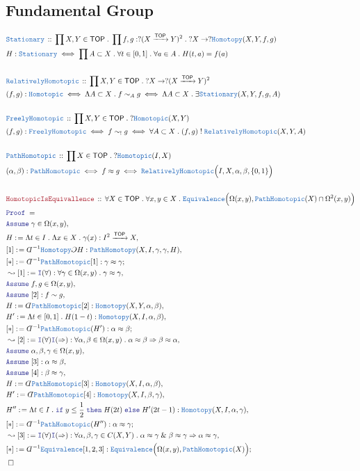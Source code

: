 \documentclass[12pt]{scrartcl}
\newcommand{\TYPE}[1]{\textcolor{NavyBlue}{\mathtt{#1}}}
\newcommand{\LOGIC}[1]{\textcolor{Blue}{\mathtt{#1}}}
\newcommand{\THM}[1]{\textcolor{Maroon}{\mathtt{#1}}}
\renewcommand{\.}{\; . \;}
\newcommand{\de}{: \kern 0.1pc =}
\newcommand{\If}{\LOGIC{if} \;}
\newcommand{\Then}{ \; \LOGIC{then} \;}
\newcommand{\Else}{\; \LOGIC{else} \;}
\newcommand{\IsNot}{\; ! \;}
\newcommand{\Theorem}[2]{& \THM{#1} \, :: \, #2 \\ & \Proof = \\ }
\newcommand{\DeclareType}[2]{& \TYPE{#1} \, :: \, #2 \\}
\newcommand{\DefineType}[3]{& #1 : \TYPE{#2} \iff #3 \\}
\newcommand{\DefineNamedType}[4]{& #1 : \TYPE{#2} \iff #3 \iff #4 \\}
\newcommand{\Page}[1]{ \begin{align*} #1 \end{align*}   }
\newcommand{ \bd }{ \ByDef }
\renewcommand{\And}{\; \& \;}
\newcommand{\Imply}{\Rightarrow}
\newcommand{\Intro}{\LOGIC{I}}
\newcommand{\Arrow}{\xrightarrow}
\newcommand{\Say}[3]{& #1 \de #2 : #3, \\}
\newcommand{\Conclude}[3]{& #1 \de #2 : #3; \\}
\newcommand{\Derive}[3]{& \leadsto #1 \de #2 : #3, \\}
\newcommand{\Assume}[2]{& \LOGIC{Assume} \; #1 : #2, \\}
\newcommand{\AssumeIn}[2]{& \LOGIC{Assume} \; #1 \in #2, \\}
\newcommand{\QED}{\; \square}
\newcommand{\EndProof}{& \QED \\}
\newcommand{\ByDef}{\rotatebox[origin=c]{-180}{$D$}}%
\newcommand{\ByConstr}{\rotatebox[origin=c]{-180}{$C$}}%
\newcommand{\Proof}{\LOGIC{Proof} \; }
\newcommand{\TOP}{\mathsf{TOP}}
\newcommand{\RH}{\TYPE{RelativelyHomotopic}}
\begin{document}
\subsection{Fundamental Group}
\Page{		
	\DeclareType{Stationary}{ 
		\prod X,Y \in \TOP \.
		\prod f,g : ?(X \Arrow{\TOP} Y)^2 \.
		?X \to ?\TYPE{Homotopy}(X,Y,f,g) 
	}
	\DefineType{H}{Stationary}{\prod A \subset X \. \forall t \in [0,1] \. \forall a \in A \. H(t,a) = f(a) }
	\\
	\DeclareType{RelativelyHomotopic}
	{
		\prod X,Y \in \TOP \.
		?X \to 
		?(X \Arrow{\TOP} Y)^2
	}
	\DefineNamedType{(f,g)}{Homotopic}{\Lambda A \subset X \. f \sim_A g}
	{
		\Lambda A \subset X \. \exists \TYPE{Stationary}(X,Y,f,g,A)
	}	
	\\
	\DeclareType{FreelyHomotopic}
	{
		\prod X,Y \in \TOP \.
		?\TYPE{Homotopic}(X,Y)
	}
	\DefineNamedType{(f,g)}{FreelyHomotopic}{f \sim_! g}
	{
		\forall A \subset X \.  (f,g) \IsNot \TYPE{RelativelyHomotopic}(X,Y,A)
	}
	\\
	\DeclareType{PathHomotopic}
	{
		\prod X \in \TOP \.
		?\TYPE{Homotopic}(I,X)
	}
	\DefineNamedType{(\alpha,\beta)}{PathHomotopic}{f \approx g}
	{
		\RH\Big(I,X,\alpha,\beta,\{0,1\}\Big)
	}
	\\
	\Theorem{HomotopicIsEquivallence}
	{
		\forall X \in \TOP \. 
		\forall x,y \in X \.
		\TYPE{Equivalence}\Big( \Omega(x,y),\TYPE{PathHomotopic}(X) \cap \Omega^2(x,y) \Big)
	}
	\AssumeIn{\gamma}{\Omega(x,y)}
	\Say{H}{\Lambda t \in I \. \Lambda x \in X \. \gamma(x) }{I^2 \Arrow{\TOP} X}
	\Say{[1]}{\bd^{-1} \TYPE{Homotopy} \ByConstr H}{\TYPE{PathHomotopy}(X, I,\gamma,\gamma,H)}
	\Conclude{[*]}{\bd^{-1}\TYPE{PathHomotopic}[1]}{\gamma \approx \gamma}
	\Derive{[1]}{\Intro(\forall)}{\forall \gamma \in \Omega(x,y) \. \gamma \approx \gamma}
	\AssumeIn{f,g}{\Omega(x,y)}
	\Assume{[2]}{f \sim g}
	\Say{ H }{\bd \TYPE{PathHomotopic}[2]}{\TYPE{Homotopy}(X,Y,\alpha,\beta)}
	\Say{ H' }{\Lambda t \in [0,1] \. H(1-t)}{\TYPE{Homotopy}(X,I,\alpha,\beta)}
	\Conclude{[*]}{\bd^{-1}\TYPE{PathHomotopic}(H')}{\alpha \approx \beta}	
	\Derive{[2]}{\Intro(\forall)\Intro(\Imply)}
	{
		\forall \alpha,\beta \in \Omega(x,y) \. 
		\alpha \approx \beta \Imply \beta \approx \alpha
	}
	\AssumeIn{\alpha,\beta,\gamma}{\Omega(x,y)}
	\Assume{[3]}{\alpha \approx \beta}
	\Assume{[4]}{\beta \approx \gamma}
	\Say{ H }{\bd \TYPE{PathHomotopic}[3]}{\TYPE{Homotopy}(X,I,\alpha,\beta)}
	\Say{ H'}{\bd \TYPE{PathHomotopic}[4]}{\TYPE{Homotopy}(X,I,\beta,\gamma)}
	\Say{H''}{ \Lambda t \in I \. \If y \le \frac{1}{2} \Then H(2t) \Else H'(2t-1) }
	{ \TYPE{Homotopy}(X,I,\alpha,\gamma)  }
	\Conclude{[*]}{\bd^{-1}\TYPE{PathHomotopic}(H'')}{\alpha \approx \gamma}	
	\Derive{[3]}{\Intro(\forall)\Intro(\Imply)}
	{
		\forall \alpha,\beta,\gamma \in C(X,Y) \. 
		\alpha \approx \gamma 
		\And
		\beta \approx \gamma  
		\Imply \alpha \approx \gamma
	}
	\Conclude{[*]}{\bd^{-1} \TYPE{Equivalence}[1,2,3]}{\TYPE{Equivalence}\Big( \Omega(x,y),\TYPE{PathHomotopic}(X) \Big)}
	\EndProof
}
\end{document}
